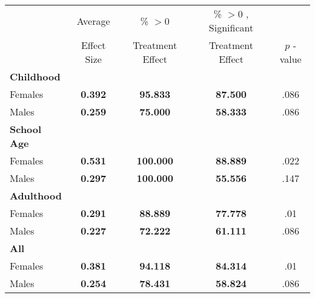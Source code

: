 \begin{tabular}{l c c c c}
\toprule
 & Average & \% $ >0 $ & \% $ >0 $ , Significant & \citet{Rosenbaum_2005_Distribution_JRSS} \\
 & Effect Size & Treatment Effect & Treatment Effect & $ p $ -value \\
\midrule
\textbf{Childhood} & & & & \\
\quad Females &  \textbf{    0.392} & \textbf{   95.833} & \textbf{   87.500} & .086 \\
\quad Males &  \textbf{    0.259} & \textbf{   75.000} & \textbf{   58.333} & .086 \\
\midrule
\textbf{School Age} & & & & \\
\quad Females &  \textbf{    0.531} & \textbf{  100.000} & \textbf{   88.889} & .022 \\
\quad Males &  \textbf{    0.297} & \textbf{  100.000} & \textbf{   55.556} & .147 \\
\midrule
\textbf{Adulthood} & & & & \\
\quad Females &  \textbf{    0.291} & \textbf{   88.889} & \textbf{   77.778} & .01 \\
\quad Males &  \textbf{    0.227} & \textbf{   72.222} & \textbf{   61.111} & .086 \\
\midrule
\textbf{All} & & & & \\
\quad Females &  \textbf{    0.381} & \textbf{   94.118} & \textbf{   84.314} & .01 \\
\quad Males &  \textbf{    0.254} & \textbf{   78.431} & \textbf{   58.824} & .086 \\
\bottomrule
\end{tabular}
